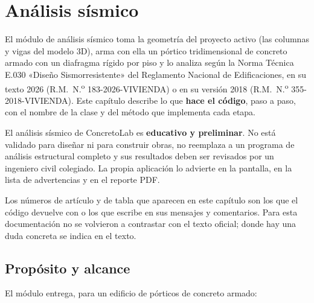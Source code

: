 \section{Análisis sísmico}
\label{sec:sis}

El módulo de análisis sísmico toma la geometría del proyecto activo (las columnas y vigas del modelo 3D), arma con
ella un pórtico tridimensional de concreto armado con un diafragma rígido por piso y lo analiza según la Norma Técnica
E.030 «Diseño Sismorresistente» del Reglamento Nacional de Edificaciones, en su texto 2026 (R.M.~N.\textsuperscript{o}
183-2026-VIVIENDA) o en su versión 2018 (R.M.~N.\textsuperscript{o} 355-2018-VIVIENDA). Este capítulo describe lo que
\textbf{hace el código}, paso a paso, con el nombre de la clase y del método que implementa cada etapa.

\begin{importante}
El análisis sísmico de ConcretoLab es \textbf{educativo y preliminar}. No está validado para diseñar ni para construir
obras, no reemplaza a un programa de análisis estructural completo y sus resultados deben ser revisados por un
ingeniero civil colegiado. La propia aplicación lo advierte en la pantalla, en la lista de advertencias y en el reporte
PDF.
\end{importante}

\begin{nota}
Los números de artículo y de tabla que aparecen en este capítulo son los que el código devuelve con
 o los que escribe en sus mensajes y comentarios. Para esta documentación no se
volvieron a contrastar con el texto oficial; donde hay una duda concreta se indica en el texto.
\end{nota}

\subsection{Propósito y alcance}
\label{sec:sis-alcance}

El módulo entrega, para un edificio de pórticos de concreto armado:

